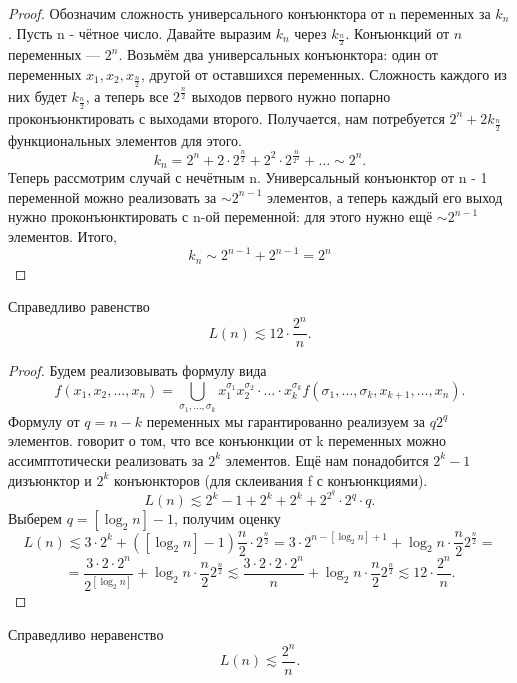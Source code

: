 \begin{proof}
Обозначим сложность универсального конъюнктора от n переменных за $k_n$.
Пусть n - чётное число. Давайте выразим $k_n$ через $k_{\frac{n}{2}}$. 
Конъюнкций от $n$ переменных --- $2^n$. Возьмём два универсальных конъюнктора: 
один от переменных $x_1,x_2, x_{\frac{n}{2}}$, другой от оставшихся переменных. 
Сложность каждого из них будет $k_{\frac{n}{2}}$, 
а теперь все $2^{\frac{n}{2}}$ выходов первого нужно
попарно проконъюнктировать с выходами второго. Получается, нам потребуется $2^n
+ 2k_{\frac{n}{2}}$ функциональных элементов для этого. \[
	k_n = 2^n + 2\cdot 2^{\frac{n}{2}} + 2^2\cdot 2^{\frac{n}{2^2}} + \ldots
\sim 2^n .\]
Теперь рассмотрим случай с нечётным n. Универсальный конъюнктор от n - 1
переменной можно реализовать за $\sim 2^{n - 1}$ элементов, а теперь
каждый его выход нужно проконъюнктировать с n-ой переменной: для этого нужно
ещё $\sim 2^{n - 1}$ элементов. Итого, \[k_n \sim 2^{n - 1} + 2^{n - 1} = 2^n\]
\end{proof}
\begin{theorem}
	Справедливо равенство \[
		L(n) \lesssim 12 \cdot \frac{2^n}{n}
	.\] 
\end{theorem}
\begin{proof}
Будем реализовывать формулу вида \[
	f(x_1, x_2,\ldots,x_n) = \bigcup\limits_{\sigma_1,\ldots,
	\sigma_k}x_1^{\sigma_1}x_2^{\sigma_2}\cdot\ldots\cdot x_k^{\sigma_k}
	f(\sigma_1, \ldots, \sigma_k, x_{k+1}, \ldots, x_n)
.\] 
Формулу от $q = n - k$ переменных мы гарантированно реализуем за  $q2^q$
элементов.
 говорит о том, что все конъюнкции от k переменных
можно ассимптотически реализовать за $2^k$ элементов. Ещё нам понадобится
$2^k-1$ дизъюнктор и $2^k$ конъюнкторов (для склеивания f с конъюнкциями).
 \[
	 L(n) \lesssim 2^k - 1 + 2^k + 2^k+ 2^{2^q}\cdot 2^q\cdot q
.\] 
Выберем $q = \left[\log_2 n\right] - 1$, получим оценку \[
L(n) \lesssim 3\cdot 2^k + (\left[\log_2 n\right] - 1 ) \frac{n}{2} \cdot
2^{\frac{n}{2}} = 3\cdot 2^{n-\left[\log_2n\right] +1} + \log_2n \cdot \frac{n}{2}
2^{\frac{n}{2}} = \] 
\[
	= \frac{ 3\cdot 2\cdot 2^n }{2^{\left[ \log_2n \right] }} +  \log_2n \cdot \frac{n}{2}
	2^{\frac{n}{2}} \lesssim \frac{3\cdot 2\cdot 2\cdot 2^n}{n} +  \log_2n \cdot \frac{n}{2}
	2^{\frac{n}{2}} \lesssim 12\cdot \frac{2^n}{n}
.\] 
\end{proof}

\begin{theorem}[О. Б. Лупанов]
	Справедливо неравенство \[L(n) \lesssim \frac{2^n}{n}.\]
\end{theorem}

